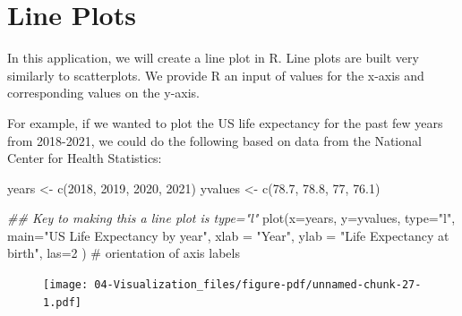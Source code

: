 \documentclass[
  letterpaper,
  DIV=11,
  numbers=noendperiod]{scrreprt}
\newenvironment{Shaded}{\begin{snugshade}}{\end{snugshade}}
\newcommand{\AttributeTok}[1]{\textcolor[rgb]{0.40,0.45,0.13}{#1}}
\newcommand{\CommentTok}[1]{\textcolor[rgb]{0.37,0.37,0.37}{#1}}
\newcommand{\DecValTok}[1]{\textcolor[rgb]{0.68,0.00,0.00}{#1}}
\newcommand{\DocumentationTok}[1]{\textcolor[rgb]{0.37,0.37,0.37}{\textit{#1}}}
\newcommand{\FloatTok}[1]{\textcolor[rgb]{0.68,0.00,0.00}{#1}}
\newcommand{\FunctionTok}[1]{\textcolor[rgb]{0.28,0.35,0.67}{#1}}
\newcommand{\NormalTok}[1]{\textcolor[rgb]{0.00,0.23,0.31}{#1}}
\newcommand{\OtherTok}[1]{\textcolor[rgb]{0.00,0.23,0.31}{#1}}
\newcommand{\StringTok}[1]{\textcolor[rgb]{0.13,0.47,0.30}{#1}}
\begin{document}
\hypertarget{line-plots}{%
\section{Line Plots}\label{line-plots}}

In this application, we will create a line plot in R. Line plots are
built very similarly to scatterplots. We provide R an input of values
for the x-axis and corresponding values on the y-axis.

For example, if we wanted to plot the US life expectancy for the past
few years from 2018-2021, we could do the following based on data from
the National Center for Health Statistics:

\begin{Shaded}
\begin{Highlighting}[]
\NormalTok{years }\OtherTok{\textless{}{-}} \FunctionTok{c}\NormalTok{(}\DecValTok{2018}\NormalTok{, }\DecValTok{2019}\NormalTok{, }\DecValTok{2020}\NormalTok{, }\DecValTok{2021}\NormalTok{)}
\NormalTok{yvalues }\OtherTok{\textless{}{-}} \FunctionTok{c}\NormalTok{(}\FloatTok{78.7}\NormalTok{, }\FloatTok{78.8}\NormalTok{, }\DecValTok{77}\NormalTok{, }\FloatTok{76.1}\NormalTok{)}

\DocumentationTok{\#\# Key to making this a line plot is type="l"}
\FunctionTok{plot}\NormalTok{(}\AttributeTok{x=}\NormalTok{years,}
     \AttributeTok{y=}\NormalTok{yvalues,}
     \AttributeTok{type=}\StringTok{"l"}\NormalTok{,}
     \AttributeTok{main=}\StringTok{"US Life Expectancy by year"}\NormalTok{,}
     \AttributeTok{xlab =} \StringTok{"Year"}\NormalTok{,}
     \AttributeTok{ylab =} \StringTok{"Life Expectancy at birth"}\NormalTok{,}
     \AttributeTok{las=}\DecValTok{2}\NormalTok{ ) }\CommentTok{\# orientation of axis labels}
\end{Highlighting}
\end{Shaded}

\begin{figure}[H]

{\centering \texttt{[image: 04-Visualization\_files/figure-pdf/unnamed-chunk-27-1.pdf]}

}

\end{figure}
\end{document}
